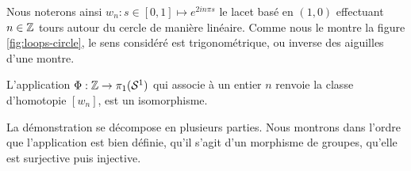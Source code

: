 Nous noterons ainsi $w_n:s\in[0,1]\mapsto e^{2in\pi s}$ le lacet basé en $(1,0)$ effectuant $n\in\mathbb{Z}$ tours autour du cercle de manière linéaire. Comme nous le montre la figure \ref{fig:loops-circle}, le sens considéré est trigonométrique, ou inverse des aiguilles d'une montre.

\begin{theorem}\label{th:grp-funda-circle}
L'application $\Phi:\mathbb{Z}\to\pi_1(\mathcal{S}^{1})$ qui associe à un entier $n$ renvoie la classe d'homotopie $[w_n]$, est un isomorphisme.
\end{theorem}

La démonstration se décompose en plusieurs parties. Nous montrons dans l'ordre que l'application est bien définie, qu'il s'agit d'un morphisme de groupes, qu'elle est surjective puis injective.


